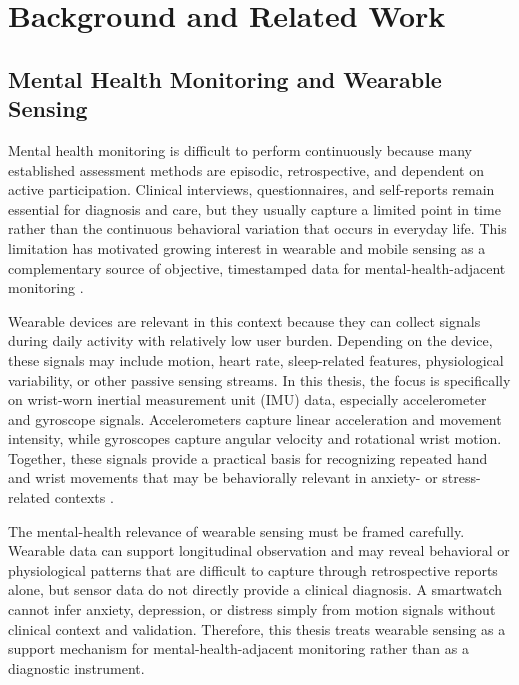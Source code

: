 \chapter{Background and Related Work}
\label{chap:background}

\section{Mental Health Monitoring and Wearable Sensing}

Mental health monitoring is difficult to perform continuously because many established assessment methods are episodic, retrospective, and dependent on active participation. Clinical interviews, questionnaires, and self-reports remain essential for diagnosis and care, but they usually capture a limited point in time rather than the continuous behavioral variation that occurs in everyday life. This limitation has motivated growing interest in wearable and mobile sensing as a complementary source of objective, timestamped data for mental-health-adjacent monitoring \cite{abdalrazaq2023wearable,gomes2023mentalhealth,levine2020passivesensing,lago2024longitudinal,sabry2022mlhealthcare,borghare2024wearable}.

Wearable devices are relevant in this context because they can collect signals during daily activity with relatively low user burden. Depending on the device, these signals may include motion, heart rate, sleep-related features, physiological variability, or other passive sensing streams. In this thesis, the focus is specifically on wrist-worn inertial measurement unit (IMU) data, especially accelerometer and gyroscope signals. Accelerometers capture linear acceleration and movement intensity, while gyroscopes capture angular velocity and rotational wrist motion. Together, these signals provide a practical basis for recognizing repeated hand and wrist movements that may be behaviorally relevant in anxiety- or stress-related contexts \cite{lara2013survey,bulling2014tutorial}.

The mental-health relevance of wearable sensing must be framed carefully. Wearable data can support longitudinal observation and may reveal behavioral or physiological patterns that are difficult to capture through retrospective reports alone, but sensor data do not directly provide a clinical diagnosis. A smartwatch cannot infer anxiety, depression, or distress simply from motion signals without clinical context and validation. Therefore, this thesis treats wearable sensing as a support mechanism for mental-health-adjacent monitoring rather than as a diagnostic instrument.

